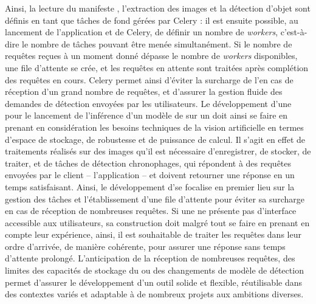 	Ainsi, la lecture du manifeste \iiif, l'extraction des images et la détection d'objet sont définis en tant que tâches de fond gérées par Celery : il est ensuite possible, au lancement de l'application et de Celery, de définir un nombre de \textit{workers}, c'est-à-dire le nombre de tâches pouvant être menée simultanément. Si le nombre de requêtes reçues à un moment donné dépasse le nombre de \textit{workers} disponibles, une file d'attente se crée, et les requêtes en attente sont traitées après complétion des requêtes en cours. Celery permet ainsi d'éviter la surcharge de l'\api en cas de réception d'un grand nombre de requêtes, et d'assurer la gestion fluide des demandes de détection envoyées par les utilisateurs.
	Le développement d'une \api pour le lancement de l'inférence d'un modèle de \dl sur un \gpu doit ainsi se faire en prenant en considération les besoins techniques de la vision artificielle en termes d'espace de stockage, de robustesse et de puissance de calcul. Il s'agit en effet de traitements réalisés sur des images qu'il est nécessaire d'enregistrer, de stocker, de traiter, et de tâches de détection chronophages, qui répondent à des requêtes envoyées par le client -- l'application -- et doivent retourner une réponse en un temps satisfaisant. Ainsi, le développement d'\exapi se focalise en premier lieu sur la gestion des tâches et l'établissement d'une file d'attente pour éviter sa surcharge en cas de réception de nombreuses requêtes. Si une \api ne présente pas d'interface accessible aux utilisateurs, sa construction doit malgré tout se faire en prenant en compte leur expérience, ainsi, il est souhaitable de traiter les requêtes dans leur ordre d'arrivée, de manière cohérente, pour assurer une réponse sans temps d'attente prolongé. L'anticipation de la réception de nombreuses requêtes, des limites des capacités de stockage du \gpu ou des changements de modèle de détection permet d'assurer le développement d'un outil solide et flexible, réutilisable dans des contextes variés et adaptable à de nombreux projets aux ambitions diverses.